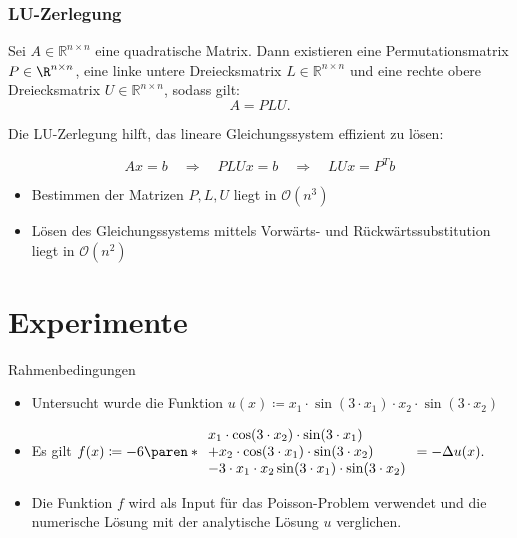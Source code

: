\documentclass[9pt, t]{beamer}
\begin{document}
\begin{frame}
\frametitle{LU-Zerlegung}

Sei \(A \in \mathbb{R}^{n \times n}\) eine quadratische Matrix. Dann existieren eine
Permutationsmatrix \(P \in \R^{n \times n}\), eine linke untere Dreiecksmatrix
\(L \in \mathbb{R}^{n \times n}\) und eine rechte obere Dreiecksmatrix \(U \in \mathbb{R}^{n
\times n}\), sodass gilt:
\[
    A = PLU.
\]

Die LU-Zerlegung  hilft, das lineare Gleichungssystem effizient zu lösen:

\[
    A x = b \quad \Rightarrow \quad PLU x = b \quad \Rightarrow \quad LU x = P^T b
\]
\begin{itemize}
    \item Bestimmen der Matrizen \(P, L, U\) liegt in \(\mathcal{O}(n^3)\)
    \item Lösen des Gleichungssystems mittels Vorwärts- und Rückwärtssubstitution liegt in \(\mathcal{O}(n^2)\)
\end{itemize}
\end{frame}

















\section{Experimente}

\begin{frame}{Rahmenbedingungen}
    \begin{itemize}
        \item Untersucht wurde die Funktion \(u(x) \coloneq x_1 \cdot \sin(3 \cdot x_1) \cdot x_2 \cdot \sin(3 \cdot x_2)\)
        \item Es gilt \(f(x) \coloneq -6 \paren*{\begin{array}{l}
            x_1 \cdot \cos(3 \cdot x_2) \cdot \sin(3 \cdot x_1)   \\
            + x_2 \cdot \cos(3 \cdot x_1) \cdot \sin(3 \cdot x_2) \\
            - 3 \cdot x_1 \cdot x_2 \sin(3 \cdot x_1) \cdot \sin(3 \cdot x_2)
        \end{array}}
    = -\Delta u(x). \)
        \item Die Funktion \(f\) wird als Input für das Poisson-Problem verwendet
        und die numerische Lösung mit der analytische Lösung \(u\) verglichen.
    \end{itemize}
    
\end{frame}
\end{document}
